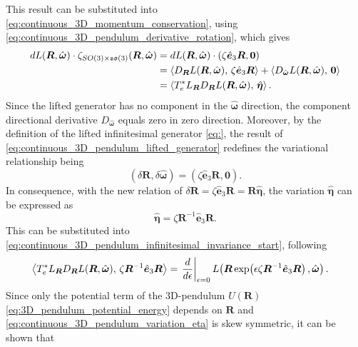 This result can be substituted into \eqref{eq:continuous_3D_momentum_conservation}, using \eqref{eq:continuous_3D_pendulum_derivative_rotation}, which gives
\begin{align}
dL(\bm{R},\hat{\bm{\omega}})\cdot
\zeta_{SO(3)\times\mathfrak{so}(3)}(\bm{R},\hat{\bm{\omega}})
&=
dL(\bm{R},\hat{\bm{\omega}})\cdot
(\zeta \hat{\bm{e}}_3\bm{R},\bm{0}) \notag\\
&=
\left\langle D_{\bm{R}}L(\bm{R},\hat{\bm{\omega}}),\,\zeta \hat{\bm{e}}_3\bm{R}\right\rangle
+
\left\langle D_{\hat{\bm{\omega}}}L(\bm{R},\hat{\bm{\omega}}),\,\bm{0}\right\rangle \notag\\
&=
\left\langle T_e^*L_{\bm{R}}D_{\bm{R}}L(\bm{R},\hat{\bm{\omega}}),\,
\hat{\bm{\eta}}\right\rangle.
\label{eq:continuous_3D_pendulum_infinitesimal_invariance_start}
\end{align}
Since the lifted generator has no component in the $\hat{\bm{\omega}}$ direction, the component directional derivative $D_{\hat{\bm{\omega}}}$ equals zero in zero direction. Moreover, by the definition of the lifted infinitesimal generator \eqref{eq:}, the result of \eqref{eq:continuous_3D_pendulum_lifted_generator} redefines the variational relationship being 
\begin{equation} \label{eq:continuous_3D_pendulum_lifted_action_generator_variation}
    (\delta \bm{R}, \delta \hat{\bm{\omega}}) = (\zeta \hat{\bm{e}}_3\bm{R},\bm{0}).
\end{equation}
In consequence, with the new relation of $\delta \bm{R} = \zeta \hat{\bm{e}}_3 \bm{R} = \bm{R} \hat{\bm{\eta}}$, the variation $\hat{\bm{\eta}}$ can be expressed as
\begin{equation}\label{eq:continuous_3D_pendulum_variation_eta}
    \hat{\bm{\eta}}= \zeta \bm{R}^{-1} \hat{\bm{e}}_3 \bm{R}.
\end{equation}
This can be substituted into \eqref{eq:continuous_3D_pendulum_infinitesimal_invariance_start}, following
\begin{align}
\left\langle T_e^*L_{\bm{R}}D_{\bm{R}}L(\bm{R},\hat{\bm{\omega}}),\,
\zeta \bm{R}^{-1}\hat{\bm{e}}_3\bm{R}\right\rangle
&=
\left.\frac{d}{d\epsilon}\right|_{\epsilon=0}
L\!\left(\bm{R}\exp\!\left(\epsilon \zeta \bm{R}^{-1}\hat{\bm{e}}_3\bm{R}\right),\hat{\bm{\omega}}\right).
\notag
\end{align}
Since only the potential term of the 3D-pendulum $U(\bm{R})$ \eqref{eq:3D_pendulum_potential_energy} depends on $\bm{R}$ and \eqref{eq:continuous_3D_pendulum_variation_eta} is skew symmetric, it can be shown that 
